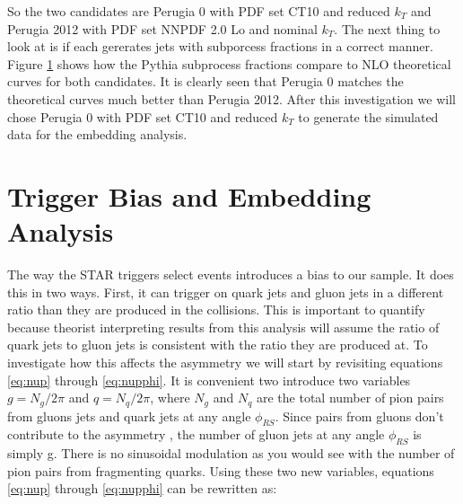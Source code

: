 \documentclass[abstract = on,listof=totoc, bibliography=totoc]{scrreprt}
\newcommand{\phirs}{\phi_{RS}}
\begin{document}
So the two candidates are Perugia 0 with PDF set CT10 and reduced $k_T$ and Perugia 2012 with PDF set NNPDF 2.0 Lo and nominal $k_T$.  The next thing to look at is if each gererates jets with subporcess fractions in a correct manner. Figure \ref{fig:jetSubprocessFractions} shows how the Pythia subprocess fractions compare to NLO theoretical curves for both candidates. It is clearly seen that Perugia 0 matches the theoretical curves much better than Perugia 2012. After this investigation we will chose Perugia 0 with PDF set CT10 and reduced $k_T$ to generate the simulated data for the embedding analysis. 

\begin{figure}
\caption[]{}
\label{fig:jetSubprocessFractions}
\end{figure}

%
%

\chapter{Trigger Bias and Embedding Analysis}
\label{ch:trigBias}

The way the STAR triggers select events introduces a bias to our sample. It does this in two ways. First, it can trigger on quark jets and gluon jets in a different ratio than they are produced in the collisions. This is important to quantify because theorist interpreting results from this analysis will assume the ratio of quark jets to gluon jets is consistent with the ratio they are produced at. To investigate how this affects the asymmetry we will start by revisiting equations \ref{eq:nup} through \ref{eq:nupphi}. It is convenient two introduce two variables $g = N_g/2\pi$ and $q = N_q/2\pi$, where $N_g$ and $N_q$ are the total number of pion pairs from gluons jets and quark jets at any angle $\phirs$. Since pairs from gluons don't contribute to the asymmetry \cite{Jaffe:spinProc, bacchettaRadici2}, the number of gluon jets at any angle $\phirs$ is simply g. There is no sinusoidal modulation as you would see with the number of pion pairs from fragmenting quarks. Using these two new variables, equations \ref{eq:nup} through \ref{eq:nupphi} can be rewritten as:
\end{document}
